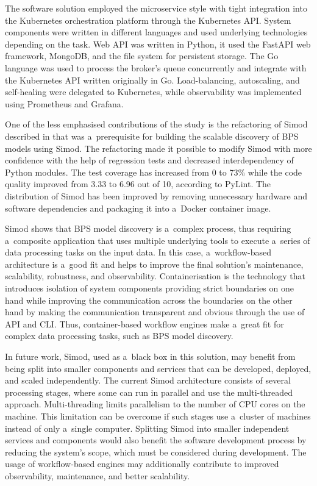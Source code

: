 \documentclass[12pt]{article}
\begin{document}
\noindent
The software solution employed the microservice style with tight integration into the Kubernetes orchestration platform through the Kubernetes API. System components were written in different languages and used underlying technologies depending on the task. Web API was written in Python, it used the FastAPI web framework, MongoDB, and the file system for persistent storage. The Go language was used to process the broker's queue concurrently and integrate with the Kubernetes API written originally in Go. Load-balancing, autoscaling, and self-healing were delegated to Kubernetes, while observability was implemented using Prometheus and Grafana.

One of the less emphasised contributions of the study is the refactoring of Simod described in  that was a~prerequisite for building the scalable discovery of BPS models using Simod. The refactoring made it possible to modify Simod with more confidence with the help of regression tests and decreased interdependency of Python modules. The test coverage has increased from 0 to 73\% while the code quality improved from 3.33 to 6.96 out of 10, according to PyLint. The distribution of Simod has been improved by removing unnecessary hardware and software dependencies and packaging it into a~Docker container image.

Simod shows that BPS model discovery is a~complex process, thus requiring a~composite application that uses multiple underlying tools to execute a~series of data processing tasks on the input data. 
In this case, a~workflow-based architecture is a~good fit and helps to improve the final solution's maintenance, scalability, robustness, and observability.
Containerisation is the technology that introduces isolation of system components providing strict boundaries on one hand while improving the communication across the boundaries on the other hand by making the communication transparent and obvious through the use of API and CLI.
Thus, container-based workflow engines make a~great fit for complex data processing tasks, such as BPS model discovery.

In future work, Simod, used as a~black box in this solution, may benefit from being split into smaller components and services that can be developed, deployed, and scaled independently. The current Simod architecture consists of several processing stages, where some can run in parallel and use the multi-threaded approach. Multi-threading limits parallelism to the number of CPU cores on the machine. This limitation can be overcome if such stages use a~cluster of machines instead of only a~single computer. Splitting Simod into smaller independent services and components would also benefit the software development process by reducing the system's scope, which must be considered during development. The usage of workflow-based engines may additionally contribute to improved observability, maintenance, and better scalability.
\end{document}
